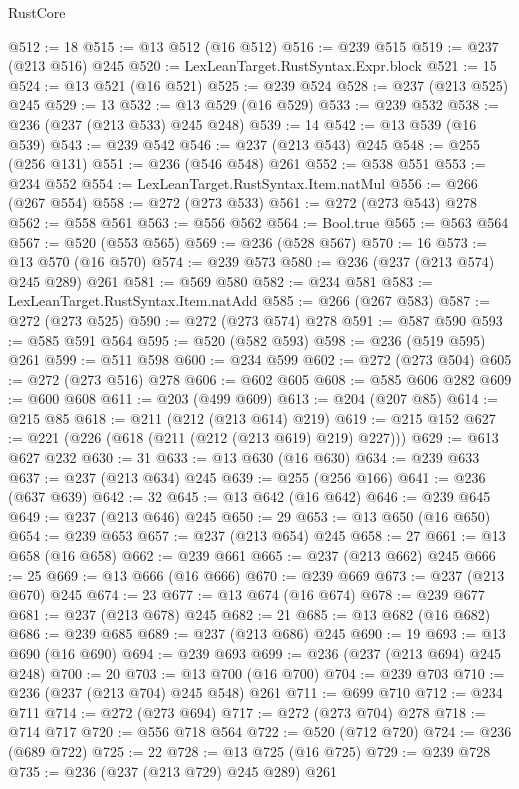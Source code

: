 \begin{lexlean}{RustCore}
\begin{coremodule}
@512 := 18
@515 := @13 @512 (@16 @512)
@516 := @239 @515
@519 := @237 (@213 @516) @245
@520 := LexLeanTarget.RustSyntax.Expr.block
@521 := 15
@524 := @13 @521 (@16 @521)
@525 := @239 @524
@528 := @237 (@213 @525) @245
@529 := 13
@532 := @13 @529 (@16 @529)
@533 := @239 @532
@538 := @236 (@237 (@213 @533) @245 @248)
@539 := 14
@542 := @13 @539 (@16 @539)
@543 := @239 @542
@546 := @237 (@213 @543) @245
@548 := @255 (@256 @131)
@551 := @236 (@546 @548) @261
@552 := @538 @551
@553 := @234 @552
@554 := LexLeanTarget.RustSyntax.Item.natMul
@556 := @266 (@267 @554)
@558 := @272 (@273 @533)
@561 := @272 (@273 @543) @278
@562 := @558 @561
@563 := @556 @562
@564 := Bool.true
@565 := @563 @564
@567 := @520 (@553 @565)
@569 := @236 (@528 @567)
@570 := 16
@573 := @13 @570 (@16 @570)
@574 := @239 @573
@580 := @236 (@237 (@213 @574) @245 @289) @261
@581 := @569 @580
@582 := @234 @581
@583 := LexLeanTarget.RustSyntax.Item.natAdd
@585 := @266 (@267 @583)
@587 := @272 (@273 @525)
@590 := @272 (@273 @574) @278
@591 := @587 @590
@593 := @585 @591 @564
@595 := @520 (@582 @593)
@598 := @236 (@519 @595) @261
@599 := @511 @598
@600 := @234 @599
@602 := @272 (@273 @504)
@605 := @272 (@273 @516) @278
@606 := @602 @605
@608 := @585 @606 @282
@609 := @600 @608
@611 := @203 (@499 @609)
@613 := @204 (@207 @85)
@614 := @215 @85
@618 := @211 (@212 (@213 @614) @219)
@619 := @215 @152
@627 := @221 (@226 (@618 (@211 (@212 (@213 @619) @219) @227)))
@629 := @613 @627 @232
@630 := 31
@633 := @13 @630 (@16 @630)
@634 := @239 @633
@637 := @237 (@213 @634) @245
@639 := @255 (@256 @166)
@641 := @236 (@637 @639)
@642 := 32
@645 := @13 @642 (@16 @642)
@646 := @239 @645
@649 := @237 (@213 @646) @245
@650 := 29
@653 := @13 @650 (@16 @650)
@654 := @239 @653
@657 := @237 (@213 @654) @245
@658 := 27
@661 := @13 @658 (@16 @658)
@662 := @239 @661
@665 := @237 (@213 @662) @245
@666 := 25
@669 := @13 @666 (@16 @666)
@670 := @239 @669
@673 := @237 (@213 @670) @245
@674 := 23
@677 := @13 @674 (@16 @674)
@678 := @239 @677
@681 := @237 (@213 @678) @245
@682 := 21
@685 := @13 @682 (@16 @682)
@686 := @239 @685
@689 := @237 (@213 @686) @245
@690 := 19
@693 := @13 @690 (@16 @690)
@694 := @239 @693
@699 := @236 (@237 (@213 @694) @245 @248)
@700 := 20
@703 := @13 @700 (@16 @700)
@704 := @239 @703
@710 := @236 (@237 (@213 @704) @245 @548) @261
@711 := @699 @710
@712 := @234 @711
@714 := @272 (@273 @694)
@717 := @272 (@273 @704) @278
@718 := @714 @717
@720 := @556 @718 @564
@722 := @520 (@712 @720)
@724 := @236 (@689 @722)
@725 := 22
@728 := @13 @725 (@16 @725)
@729 := @239 @728
@735 := @236 (@237 (@213 @729) @245 @289) @261

\end{coremodule}
\end{lexlean}

